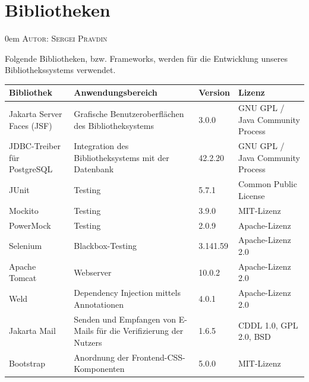 \documentclass{article}
\makeatletter
\newcommand{\sectionauthor}[1]{
	{\parindent 0em \large \scshape Autor: #1 \par \nobreak \vspace*{1em}}
	\@afterheading
}
\makeatother
\begin{document}


\newpage
\section{Bibliotheken}
\sectionauthor{Sergei Pravdin}

\newenvironment{controls}
{
    \begin{table}[H]
        \centering
        \begin{tabular}{ p{7em} p{19em} p{4em} p{12em} }
            \toprule
            \textbf{Bibliothek} & \textbf{Anwendungsbereich} & \textbf{Version} & \textbf{Lizenz}\\
            \midrule
        }
        {
            \bottomrule
        \end{tabular}
    \end{table}
}

Folgende Bibliotheken, bzw. Frameworks, werden für die Entwicklung unseres Bibliothekssystems verwendet.

\begin{controls}
    Jakarta Server Faces (JSF) & Grafische Benutzeroberflächen des Bibliotheksystems & 3.0.0 & GNU GPL / Java Community Process\\
    JDBC-Treiber für PostgreSQL & Integration des Bibliotheksystems mit der Datenbank & 42.2.20 & GNU GPL / Java Community Process\\
    JUnit & Testing & 5.7.1 & Common Public License\\
    Mockito & Testing & 3.9.0 & MIT-Lizenz\\
    PowerMock & Testing & 2.0.9 & Apache-Lizenz\\
    Selenium & Blackbox-Testing & 3.141.59 & Apache-Lizenz 2.0\\
    Apache Tomcat & Webserver & 10.0.2 & Apache-Lizenz 2.0\\
    Weld & Dependency Injection mittels Annotationen & 4.0.1 & Apache-Lizenz 2.0\\
    Jakarta Mail & Senden und Empfangen von E-Mails für die Verifizierung der Nutzers & 1.6.5 & CDDL 1.0, GPL 2.0, BSD\\
    Bootstrap & Anordnung der Frontend-CSS-Komponenten & 5.0.0 & MIT-Lizenz\\
\end{controls}
\end{document}
